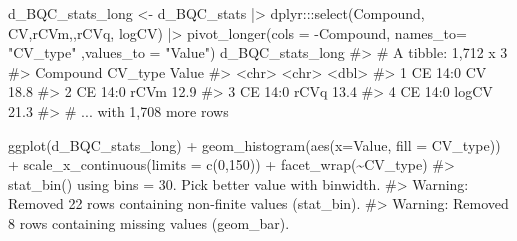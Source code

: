 \documentclass[
  letterpaper,
  DIV=11,
  numbers=noendperiod]{scrreprt}
\newenvironment{Shaded}{\begin{snugshade}}{\end{snugshade}}
\newcommand{\AttributeTok}[1]{\textcolor[rgb]{0.40,0.45,0.13}{#1}}
\newcommand{\CommentTok}[1]{\textcolor[rgb]{0.37,0.37,0.37}{#1}}
\newcommand{\DecValTok}[1]{\textcolor[rgb]{0.68,0.00,0.00}{#1}}
\newcommand{\FunctionTok}[1]{\textcolor[rgb]{0.28,0.35,0.67}{#1}}
\newcommand{\NormalTok}[1]{\textcolor[rgb]{0.00,0.23,0.31}{#1}}
\newcommand{\OtherTok}[1]{\textcolor[rgb]{0.00,0.23,0.31}{#1}}
\newcommand{\SpecialCharTok}[1]{\textcolor[rgb]{0.37,0.37,0.37}{#1}}
\newcommand{\StringTok}[1]{\textcolor[rgb]{0.13,0.47,0.30}{#1}}
\begin{document}
\begin{Shaded}
\begin{Highlighting}[]

\NormalTok{d\_BQC\_stats\_long }\OtherTok{\textless{}{-}}\NormalTok{ d\_BQC\_stats }\SpecialCharTok{|\textgreater{}}
\NormalTok{  dplyr}\SpecialCharTok{:::}\FunctionTok{select}\NormalTok{(Compound, CV,rCVm,,rCVq, logCV) }\SpecialCharTok{|\textgreater{}} 
  \FunctionTok{pivot\_longer}\NormalTok{(}\AttributeTok{cols =} \SpecialCharTok{{-}}\NormalTok{Compound, }\AttributeTok{names\_to=} \StringTok{"CV\_type"}\NormalTok{ ,}\AttributeTok{values\_to =} \StringTok{"Value"}\NormalTok{)}
\NormalTok{d\_BQC\_stats\_long}
\CommentTok{\#\textgreater{} \# A tibble: 1,712 x 3}
\CommentTok{\#\textgreater{}   Compound CV\_type Value}
\CommentTok{\#\textgreater{}   \textless{}chr\textgreater{}    \textless{}chr\textgreater{}   \textless{}dbl\textgreater{}}
\CommentTok{\#\textgreater{} 1 CE 14:0  CV       18.8}
\CommentTok{\#\textgreater{} 2 CE 14:0  rCVm     12.9}
\CommentTok{\#\textgreater{} 3 CE 14:0  rCVq     13.4}
\CommentTok{\#\textgreater{} 4 CE 14:0  logCV    21.3}
\CommentTok{\#\textgreater{} \# ... with 1,708 more rows}

\FunctionTok{ggplot}\NormalTok{(d\_BQC\_stats\_long) }\SpecialCharTok{+}
  \FunctionTok{geom\_histogram}\NormalTok{(}\FunctionTok{aes}\NormalTok{(}\AttributeTok{x=}\NormalTok{Value, }\AttributeTok{fill =}\NormalTok{ CV\_type)) }\SpecialCharTok{+} \FunctionTok{scale\_x\_continuous}\NormalTok{(}\AttributeTok{limits =} \FunctionTok{c}\NormalTok{(}\DecValTok{0}\NormalTok{,}\DecValTok{150}\NormalTok{)) }\SpecialCharTok{+} \FunctionTok{facet\_wrap}\NormalTok{(}\SpecialCharTok{\textasciitilde{}}\NormalTok{CV\_type)}
\CommentTok{\#\textgreater{} \textasciigrave{}stat\_bin()\textasciigrave{} using \textasciigrave{}bins = 30\textasciigrave{}. Pick better value with \textasciigrave{}binwidth\textasciigrave{}.}
\CommentTok{\#\textgreater{} Warning: Removed 22 rows containing non{-}finite values (stat\_bin).}
\CommentTok{\#\textgreater{} Warning: Removed 8 rows containing missing values (geom\_bar).}
\end{Highlighting}
\end{Shaded}
\end{document}
